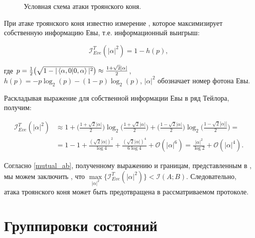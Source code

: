 \documentclass[a4paper,11pt]{article}
\begin{document}
\begin{figure}[h]
	\caption{Условная схема атаки троянского коня.}
	\label{ris:image2}
\end{figure}


При атаке троянского коня известно измерение \cite{trojan, trojan3}, которое максимизирует собственную информацию Евы, т.е. информационный выигрыш:

\begin{equation*}
\mathcal{I}_{Eve}^{T}(|\alpha|^2) = 1 - h(p),
\end{equation*}

где $p = \frac{1}{2} \big(\sqrt{1 - |\braket{\alpha, 0 | 0, \alpha}|^2 } \big) \approx \frac{1 + \sqrt2 |\alpha|}{2}$, $h(p) = -p\log_2(p) - (1-p)\log_2(p)$, $|\alpha|^2$ обозначает номер фотона Евы.

Раскладывая выражение для собственной информации Евы в ряд Тейлора, получим:

\begin{align*}
\mathcal{I}_{Eve}^{T}(|\alpha|^2) &\approx 1 + 
\Big( \frac{1 + \sqrt2 |\alpha|}{2} \Big) \log_2 \Big(\frac{1 + \sqrt2 |\alpha|}{2}\Big) + \Big( \frac{1 - \sqrt2 |\alpha|}{2} \Big) \log_2 \Big(\frac{1 - \sqrt2 |\alpha]|}{2}\Big) = \nonumber \\
&= 1 - 1 + \frac{(\sqrt2 |\alpha|)^2}{\log4} + \frac{(\sqrt2 |\alpha|)^4}{6\log4} + \mathcal{O}(|\alpha|^6) = \frac{|\alpha|^2}{\log2} + \mathcal{O}(|\alpha|^4).
\end{align*}

Согласно \eqref{mutual_ab}, полученному выражению и границам, представленным в \cite{trojan}, мы можем заключить \cite{base}, что $\max\limits_{|\alpha|^2} \big\{\mathcal{I}_{Eve}^{T} (|\alpha|^2) \big\} < \mathcal{I}(A; B)$. Следовательно, атака троянского коня может быть предотвращена в рассматриваемом протоколе.

   
\appendix
\section{Группировки состояний}\label{app}
\end{document}
